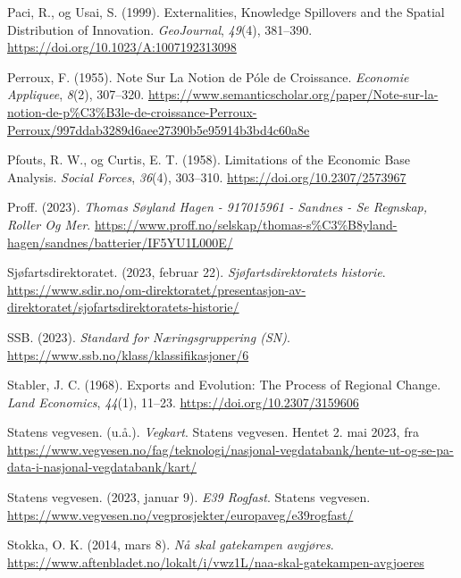 \documentclass[
]{article}
\newlength{\cslhangindent}
\newlength{\cslentryspacingunit} %
\newenvironment{CSLReferences}[2] %
 {%
  \setlength{\parindent}{0pt}
  \ifodd #1
  \let\oldpar\par
  \def\par{\hangindent=\cslhangindent\oldpar}
  \fi
  \setlength{\parskip}{#2\cslentryspacingunit}
 }%
 {}
\begin{document}
\begin{CSLReferences}{1}{0}
\leavevmode{}%
Paci, R., og Usai, S. (1999). Externalities, Knowledge Spillovers and
the Spatial Distribution of Innovation. \emph{GeoJournal}, \emph{49}(4),
381--390. \url{https://doi.org/10.1023/A:1007192313098}

\leavevmode{}%
Perroux, F. (1955). Note Sur La Notion de Póle de Croissance.
\emph{Economie Appliquee}, \emph{8}(2), 307--320.
\url{https://www.semanticscholar.org/paper/Note-sur-la-notion-de-p\%C3\%B3le-de-croissance-Perroux-Perroux/997ddab3289d6aee27390b5e95914b3bd4c60a8e}

\leavevmode{}%
Pfouts, R. W., og Curtis, E. T. (1958). Limitations of the {Economic
Base Analysis}. \emph{Social Forces}, \emph{36}(4), 303--310.
\url{https://doi.org/10.2307/2573967}

\leavevmode{}%
Proff. (2023). \emph{Thomas {Søyland Hagen} - 917015961 - {Sandnes} -
{Se Regnskap}, {Roller} Og Mer}.
\url{https://www.proff.no/selskap/thomas-s\%C3\%B8yland-hagen/sandnes/batterier/IF5YU1L000E/}

\leavevmode{}%
Sjøfartsdirektoratet. (2023, februar 22). \emph{Sjøfartsdirektoratets
historie}.
\url{https://www.sdir.no/om-direktoratet/presentasjon-av-direktoratet/sjofartsdirektoratets-historie/}

\leavevmode{}%
SSB. (2023). \emph{Standard for Næringsgruppering ({SN})}.
\url{https://www.ssb.no/klass/klassifikasjoner/6}

\leavevmode{}%
Stabler, J. C. (1968). Exports and {Evolution}: {The Process} of
{Regional Change}. \emph{Land Economics}, \emph{44}(1), 11--23.
\url{https://doi.org/10.2307/3159606}

\leavevmode{}%
Statens vegvesen. (u.å.). \emph{Vegkart}. {Statens vegvesen}. Hentet 2.
mai 2023, fra
\url{https://www.vegvesen.no/fag/teknologi/nasjonal-vegdatabank/hente-ut-og-se-pa-data-i-nasjonal-vegdatabank/kart/}

\leavevmode{}%
Statens vegvesen. (2023, januar 9). \emph{E39 Rogfast}. {Statens
vegvesen}.
\url{https://www.vegvesen.no/vegprosjekter/europaveg/e39rogfast/}

\leavevmode{}%
Stokka, O. K. (2014, mars 8). \emph{Nå skal gatekampen avgjøres}.
\url{https://www.aftenbladet.no/lokalt/i/vwz1L/naa-skal-gatekampen-avgjoeres}


\end{CSLReferences}
\end{document}
